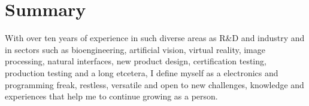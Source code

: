 \documentclass[letterpaper]{article}
\begin{document}
\section*{Summary}
With over ten years of experience in such diverse areas as R\&D and industry and in sectors such as bioengineering, artificial vision, virtual reality, image processing, natural interfaces, new product design, certification testing, production testing and a long etcetera, I define myself as a electronics and programming freak, restless, versatile and open to new challenges, knowledge and experiences that help me to continue growing as a person.
\end{document}
